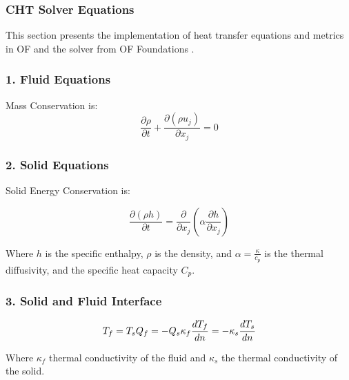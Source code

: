 \subsubsection{CHT Solver Equations}    

This section presents the implementation of heat transfer equations and metrics in \gls{OF} and the solver from \gls{OF} Foundations \cite{OpenFOAMFoundation}.
\subsubsection{1. Fluid Equations}

Mass Conservation is:
\begin{equation}
\frac{\partial \rho}{\partial t} + \frac{\partial (\rho u_j)}{\partial x_j} = 0
\end{equation}


     

\subsubsection{2. Solid Equations}
Solid Energy Conservation is:

\begin{equation}
\frac{\partial (\rho h)}{\partial t} = \frac{\partial}{\partial x_j}\left( \alpha \frac{\partial h}{\partial x_j} \right)
\end{equation}

Where \( h \) is the specific enthalpy, \( \rho \) is the density, and \( \alpha = \frac{\kappa}{c_p} \) is the thermal diffusivity, and the specific heat capacity \( C_p \).


\subsubsection{3. Solid and Fluid Interface}
\begin{equation}
T_f = T_s  \\
Q_f = -Q_s  \\
\kappa_f \frac{d T_f}{d n} = -\kappa_s \frac{d T_s}{d n} 
\end{equation}

Where \( \kappa_f \) thermal conductivity of the fluid and \( \kappa_s \)  the thermal conductivity of the solid.







